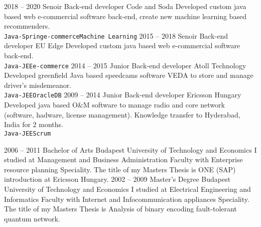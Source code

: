 \documentclass[9pt]{developercv} %
\begin{document}
\begin{entrylist}
	\entry
		{2018 -- 2020}
		{Senoir Back-end developer}
		{Code and Soda}
		{Developed custom java based web e-commercial software back-end, create new machine learning based recommenders.\\ \texttt{Java-Spring}\slashsep\texttt{e-commerce}\slashsep\texttt{Machine Learning}}
	\entry
		{2015 -- 2018}
        {Senoir Back-end developer}
        {EU Edge}
        {Developed custom java based web e-commercial software back-end.\\ \texttt{Java-JEE}\slashsep\texttt{e-commerce}}
	\entry
		{2014 -- 2015}
		{Junior Back-end developer}
		{Atoll Technology}
		{Developed greenfield Java based speedcams software VEDA to store and manage driver's misdemeanor.\\ 
		\texttt{Java-JEE}\slashsep\texttt{OracleDB}}
	\entry
        {2009 -- 2014}
        {Junior Back-end developer}
        {Ericsson Hungary}
        {Developed java based O\&M software to manage radio and core network (software, hadware, license management). Knowledge transfer to Hyderabad, India for 2 months.\\ 
    	\texttt{Java-JEE}\slashsep\texttt{Scrum}}
\end{entrylist}



\begin{entrylist}
	\entry
    	{2006 -- 2011}
	    {Bachelor of Arts}
    	{Budapest University of Technology and Economics}
    	{I studied at Management and Business Administration Faculty with Enterprise resource planning Speciality. The title of my Masters Thesis is ONE (SAP) introduction at Ericsson Hungary.}
	\entry
		{2002 -- 2009}
		{Master's Degree}
		{Budapest University of Technology and Economics}
		{I studied at Electrical Engineering and Informatics Faculty with Internet and Infocommunication appliances Speciality. The title of my Masters Thesis is Analysis of binary encoding fault-tolerant quantum network.}
\end{entrylist}

\end{document}
